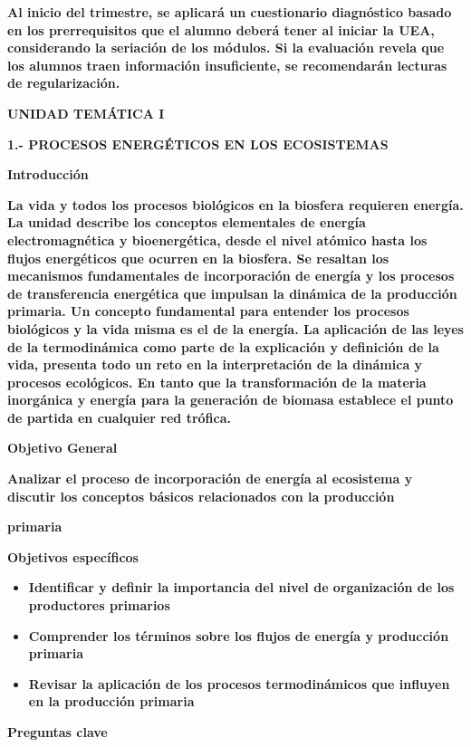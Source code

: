 \documentclass[
]{article}
\begin{document}
\textbf{Al inicio del trimestre, se aplicará un cuestionario diagnóstico
basado en los prerrequisitos que el alumno deberá tener al iniciar la
UEA, considerando la seriación de los módulos. Si la evaluación revela
que los alumnos traen información insuficiente, se recomendarán lecturas
de regularización.}

\textbf{\hfill\break
UNIDAD TEMÁTICA I}

\textbf{1.- PROCESOS ENERGÉTICOS EN LOS ECOSISTEMAS}

\textbf{Introducción}

\textbf{La vida y todos los procesos biológicos en la biosfera requieren
energía. La unidad describe los conceptos elementales de energía
electromagnética y bioenergética, desde el nivel atómico hasta los
flujos energéticos que ocurren en la biosfera. Se resaltan los
mecanismos fundamentales de incorporación de energía y los procesos de
transferencia energética que impulsan la dinámica de la producción
primaria. Un concepto fundamental para entender los procesos biológicos
y la vida misma es el de la energía. La aplicación de las leyes de la
termodinámica como parte de la explicación y definición de la vida,
presenta todo un reto en la interpretación de la dinámica y procesos
ecológicos. En tanto que la transformación de la materia inorgánica y
energía para la generación de biomasa establece el punto de partida en
cualquier red trófica.}

\textbf{Objetivo General}

\textbf{Analizar el proceso de incorporación de energía al ecosistema y
discutir los conceptos básicos relacionados con la producción}

\textbf{primaria}

\textbf{Objetivos específicos}

\begin{itemize}
\item
  \textbf{Identificar y definir la importancia del nivel de organización
  de los productores primarios}
\item
  \textbf{Comprender los términos sobre los flujos de energía y
  producción primaria}
\item
  \textbf{Revisar la aplicación de los procesos termodinámicos que
  influyen en la producción primaria}
\end{itemize}

\textbf{Preguntas clave}
\end{document}
